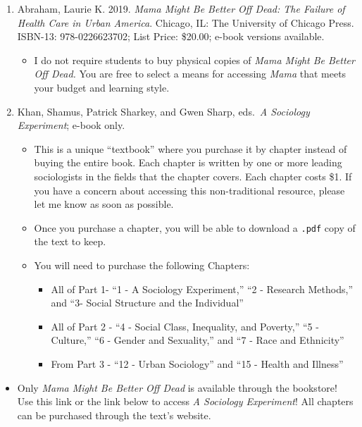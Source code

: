 \documentclass[
]{book}
\providecommand{\tightlist}{%
  \setlength{\itemsep}{0pt}\setlength{\parskip}{0pt}}
\newenvironment{rmdblock}[1]
  {\begin{shaded*}
  \begin{itemize}
  \renewcommand{\labelitemi}{
    \raisebox{-.7\height}[0pt][0pt]{
      {\setkeys{Gin}{width=3em,keepaspectratio}\texttt{[image: images/\#1]}}
    }
  }
  \item
  }
  {
  \end{itemize}
  \end{shaded*}
  }
\newenvironment{rmdwarning}
  {\begin{rmdblock}{warning}}
  {\end{rmdblock}}
\begin{document}
\begin{enumerate}
\def\labelenumi{\arabic{enumi}.}
\tightlist
\item
  Abraham, Laurie K. 2019. \emph{Mama Might Be Better Off Dead: The Failure of Health Care in Urban America}. Chicago, IL: The University of Chicago Press. ISBN-13: 978-0226623702; List Price: \$20.00; e-book versions available.

  \begin{itemize}
  \tightlist
  \item
    I do not require students to buy physical copies of \emph{Mama Might Be Better Off Dead.} You are free to select a means for accessing \emph{Mama} that meets your budget and learning style.
  \end{itemize}
\item
  Khan, Shamus, Patrick Sharkey, and Gwen Sharp, eds.~\emph{A Sociology Experiment}; e-book only.

  \begin{itemize}
  \tightlist
  \item
    This is a unique ``textbook'' where you purchase it by chapter instead of buying the entire book. Each chapter is written by one or more leading sociologists in the fields that the chapter covers. Each chapter costs \$1. If you have a concern about accessing this non-traditional resource, please let me know as soon as possible.
  \item
    Once you purchase a chapter, you will be able to download a \texttt{.pdf} copy of the text to keep.
  \item
    You will need to purchase the following Chapters:

    \begin{itemize}
    \tightlist
    \item
      All of Part 1- ``1 - A Sociology Experiment,'' ``2 - Research Methods,'' and ``3- Social Structure and the Individual''
    \item
      All of Part 2 - ``4 - Social Class, Inequality, and Poverty,'' ``5 - Culture,'' ``6 - Gender and Sexuality,'' and ``7 - Race and Ethnicity''
    \item
      From Part 3 - ``12 - Urban Sociology'' and ``15 - Health and Illness''
    \end{itemize}
  \end{itemize}
\end{enumerate}

\begin{rmdwarning}
Only \emph{Mama Might Be Better Off Dead} is available through the
bookstore! Use this link or the link below to access \emph{A Sociology
Experiment}! All chapters can be purchased through the text's website.
\end{rmdwarning}
\end{document}
